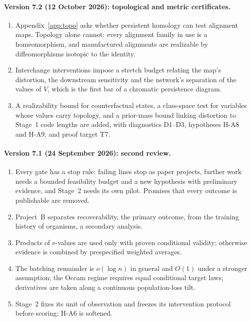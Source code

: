 \documentclass[11pt,a4paper]{article}
\begin{document}
\paragraph{Version 7.2 (12 October 2026): topological and metric certificates.}
\begin{enumerate}[leftmargin=*]
\item Appendix~\ref{app:topo} asks whether persistent homology can test
alignment maps. Topology alone cannot: every alignment family in use is a
homeomorphism, and manufactured alignments are realizable by diffeomorphisms
isotopic to the identity.
\item Interchange interventions impose a stretch budget relating the map's
distortion, the downstream sensitivity and the network's separation of the
values of $V$, which is the first bar of a chromatic persistence diagram.
\item A realizability bound for counterfactual states, a class-space test for
variables whose values carry topology, and a prior-mass bound linking
distortion to Stage~1 code lengths are added, with diagnostics D1--D3,
hypotheses H-A8 and H-A9, and proof target T7.
\end{enumerate}

\paragraph{Version 7.1 (24 September 2026): second review.}
\begin{enumerate}[leftmargin=*]
\item Every gate has a stop rule: failing lines stop as paper projects,
further work needs a bounded feasibility budget and a new hypothesis with
preliminary evidence, and Stage~2 needs its own pilot. Promises that every
outcome is publishable are removed.
\item Project~B separates recoverability, the primary outcome, from the
training history of organisms, a secondary analysis.
\item Products of e-values are used only with proven conditional validity;
otherwise evidence is combined by prespecified weighted averages.
\item The batching remainder is $o(\log n)$ in general and $O(1)$ under a
stronger assumption; the Occam regime requires equal conditional target
laws; derivatives are taken along a continuous population-loss tilt.
\item Stage~2 fixes its unit of observation and freezes its intervention
protocol before scoring; H-A6 is softened.
\end{enumerate}
\end{document}
